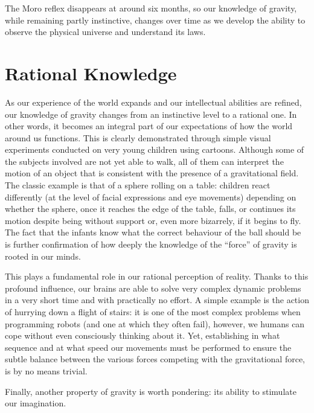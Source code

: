 The Moro reflex disappears at around six months, so our knowledge of gravity, while
remaining partly instinctive, changes over time as we develop the ability to observe the
physical universe and understand its laws.

\section{Rational Knowledge}\label{sec:01-rational}

As our experience of the world expands and our intellectual abilities are refined, our
knowledge of gravity changes from an instinctive level to a rational one. In other
words, it becomes an integral part of our expectations of how the world around us
functions. This is clearly demonstrated through simple visual experiments conducted on
very young children using cartoons. Although some of the subjects involved are not yet
able to walk, all of them can interpret the motion of an object that is consistent with
the presence of a gravitational field. The classic example is that of a sphere rolling
on a table: children react differently (at the level of facial expressions and eye
movements) depending on whether the sphere, once it reaches the edge of the table,
falls, or continues its motion despite being without support or, even more bizarrely, if
it begins to fly. The fact that the infants know what the correct behaviour of the ball
should be is further confirmation of how deeply the knowledge of the ``force'' of
gravity is rooted in our minds.

This plays a fundamental role in our rational perception of reality.
Thanks to this profound influence, our brains are able to solve very complex dynamic
problems in a very short time and with practically no effort. 
A simple example is the action of hurrying down a flight of stairs: it is one of the
most complex problems when programming robots (and one at which they often fail),
however, we humans can cope without even consciously thinking about it. Yet,
establishing in what sequence and at what speed our movements must be performed to
ensure the subtle balance between the various forces competing with the gravitational
force, is by no means trivial.

Finally, another property of gravity is worth pondering: its ability to stimulate our
imagination.

